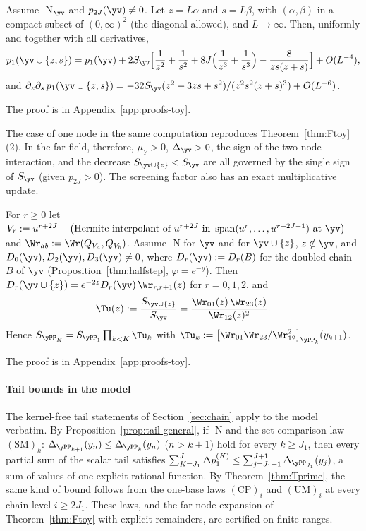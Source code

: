 \begin{proposition}\label{prop:SMinf}
Assume \hyp{N}$_{\yv}$ and $p_{2J}(\yv)\neq0$. Let $z=L\alpha$ and $s=L\beta$, with $(\alpha,\beta)$ in a compact
subset of $(0,\infty)^2$ \textup{(}the diagonal allowed\textup{)}, and $L\to\infty$. Then, uniformly and together with
all derivatives,
\[
  p_1(\yv\cup\{z,s\})=p_1(\yv)+2S_{\yv}\Bigl[\frac1{z^2}+\frac1{s^2}+8J\Bigl(\frac1{z^3}+\frac1{s^3}\Bigr)-\frac{8}{zs(z+s)}\Bigr]+O(L^{-4}),
\]
and $\partial_z\partial_s\,p_1(\yv\cup\{z,s\})=-32S_{\yv}(z^2+3zs+s^2)/(z^2s^2(z+s)^3)+O(L^{-6})$.
\end{proposition}

The proof is in Appendix~\ref{app:proofs-toy}.

The case of one node in the same computation reproduces Theorem~\ref{thm:Ftoy}(2). In the far field, therefore,
$\mu_Y>0$, $\Delta_{\yv}>0$, the sign of the two-node interaction, and the decrease
$S_{\yv\cup\{z\}}<S_{\yv}$ are all governed by the single sign of $S_{\yv}$ (given $p_{2J}>0$).
The screening factor also has an exact multiplicative update.

\begin{proposition}\label{prop:screening-update}
For $r\ge0$ let $V_r:=u^{r+2J}-\bigl(\text{Hermite interpolant of }u^{r+2J}\text{ in }
\operatorname{span}(u^r,\dots,u^{r+2J-1})\text{ at }\yv\bigr)$ and $\Wr_{ab}:=\Wr(Q_{V_a},Q_{V_b})$. Assume
\hyp{N} for $\yv$ and for $\yv\cup\{z\}$, $z\notin\yv$, and $D_0(\yv),D_2(\yv),D_3(\yv)\neq0$, where $D_r(\yv):=D_r(B)$
for the doubled chain $B$ of $\yv$ \textup{(}Proposition~\ref{thm:halfstep}, $\varphi=e^{-y}$\textup{)}. Then
$D_r(\yv\cup\{z\})=e^{-2z}D_r(\yv)\,\Wr_{r,r+1}(z)$ for $r=0,1,2$, and
\[
  \Tu(z):=\frac{S_{\yv\cup\{z\}}}{S_{\yv}}=\frac{\Wr_{01}(z)\,\Wr_{23}(z)}{\Wr_{12}(z)^2}.
\]
Hence $S_{\yPP_K}=S_{\yPP_1}\prod_{k<K}\Tu_k$ with $\Tu_k:=\bigl[\Wr_{01}\Wr_{23}/\Wr_{12}^2\bigr]_{\yPP_k}(y_{k+1})$.
\end{proposition}

The proof is in Appendix~\ref{app:proofs-toy}.

\paragraph{Tail bounds in the model}
The kernel-free tail statements of Section~\ref{sec:chain} apply to the model verbatim. By
Proposition~\ref{prop:tail-general}, if \hyp{N} and the set-comparison law
$(\mathrm{SM})_k$: $\Delta_{\yPP_{k+1}}(y_n)\le\Delta_{\yPP_k}(y_n)$ ($n>k+1$) hold for every $k\ge J_1$, then every
partial sum of the scalar tail satisfies $\sum_{K=J_1}^{J}\Delta p_1^{(K)}\le\sum_{j=J_1+1}^{J+1}\Delta_{\yPP_{J_1}}(y_j)$, a
sum of values of one explicit rational function. By Theorem~\ref{thm:Tprime}, the same kind of bound follows from the
one-base laws $(\mathrm{CP})_i$ and $(\mathrm{UM})_i$ at every chain level $i\ge2J_1$. These laws, and the far-node
expansion of Theorem~\ref{thm:Ftoy} with explicit remainders, are certified on finite ranges.

